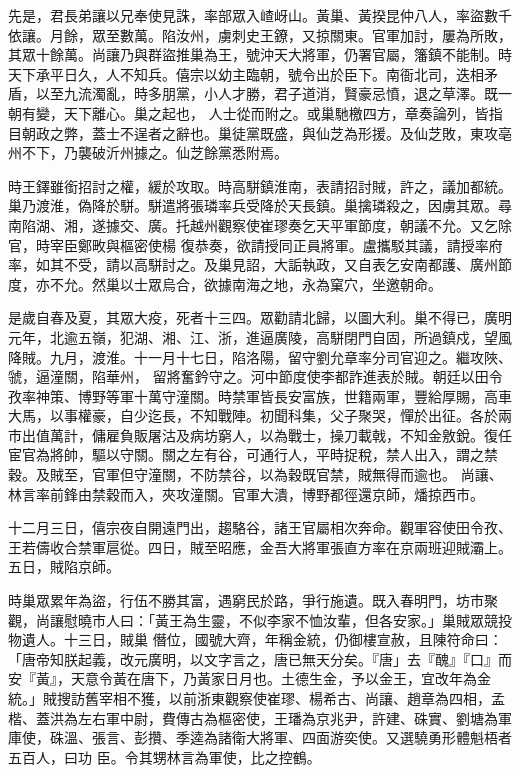 \begin{pinyinscope}
 先是，君長弟讓以兄奉使見誅，率部眾入嵖岈山。黃巢、黃揆昆仲八人，率盜數千依讓。月餘，眾至數萬。陷汝州，虜刺史王鐐，又掠關東。官軍加討，屢為所敗，其眾十餘萬。尚讓乃與群盜推巢為王，號沖天大將軍，仍署官屬，籓鎮不能制。時天下承平日久，人不知兵。僖宗以幼主臨朝，號令出於臣下。南衙北司，迭相矛盾，以至九流濁亂，時多朋黨，小人才勝，君子道消，賢豪忌憤，退之草澤。既一朝有變，天下離心。巢之起也，
 人士從而附之。或巢馳檄四方，章奏論列，皆指目朝政之弊，蓋士不逞者之辭也。巢徒黨既盛，與仙芝為形援。及仙芝敗，東攻亳州不下，乃襲破沂州據之。仙芝餘黨悉附焉。



 時王鐸雖銜招討之權，緩於攻取。時高駢鎮淮南，表請招討賊，許之，議加都統。巢乃渡淮，偽降於駢。駢遣將張璘率兵受降於天長鎮。巢擒璘殺之，因虜其眾。尋南陷湖、湘，遂據交、廣。托越州觀察使崔璆奏乞天平軍節度，朝議不允。又乞除官，時宰臣鄭畋與樞密使楊
 復恭奏，欲請授同正員將軍。盧攜駁其議，請授率府率，如其不受，請以高駢討之。及巢見詔，大詬執政，又自表乞安南都護、廣州節度，亦不允。然巢以士眾烏合，欲據南海之地，永為窠穴，坐邀朝命。



 是歲自春及夏，其眾大疫，死者十三四。眾勸請北歸，以圖大利。巢不得已，廣明元年，北逾五嶺，犯湖、湘、江、浙，進逼廣陵，高駢閉門自固，所過鎮戍，望風降賊。九月，渡淮。十一月十七日，陷洛陽，留守劉允章率分司官迎之。繼攻陜、虢，逼潼關，陷華州，
 留將奮鈐守之。河中節度使李都詐進表於賊。朝廷以田令孜率神策、博野等軍十萬守潼關。時禁軍皆長安富族，世籍兩軍，豐給厚賜，高車大馬，以事權豪，自少迄長，不知戰陣。初聞科集，父子聚哭，憚於出征。各於兩市出值萬計，傭雇負販屠沽及病坊窮人，以為戰士，操刀載戟，不知金敫銳。復任宦官為將帥，驅以守關。關之左有谷，可通行人，平時捉稅，禁人出入，謂之禁穀。及賊至，官軍但守潼關，不防禁谷，以為穀既官禁，賊無得而逾也。
 尚讓、林言率前鋒由禁穀而入，夾攻潼關。官軍大潰，博野都徑還京師，燔掠西市。



 十二月三日，僖宗夜自開遠門出，趨駱谷，諸王官屬相次奔命。觀軍容使田令孜、王若儔收合禁軍扈從。四日，賊至昭應，金吾大將軍張直方率在京兩班迎賊灞上。五日，賊陷京師。



 時巢眾累年為盜，行伍不勝其富，遇窮民於路，爭行施遺。既入春明門，坊市聚觀，尚讓慰曉市人曰：「黃王為生靈，不似李家不恤汝輩，但各安家。」巢賊眾競投物遺人。十三日，賊巢
 僭位，國號大齊，年稱金統，仍御樓宣赦，且陳符命曰：「唐帝知朕起義，改元廣明，以文字言之，唐已無天分矣。『唐」去『醜』『口』而安『黃』，天意令黃在唐下，乃黃家日月也。土德生金，予以金王，宜改年為金統。」賊搜訪舊宰相不獲，以前浙東觀察使崔璆、楊希古、尚讓、趙章為四相，孟楷、蓋洪為左右軍中尉，費傳古為樞密使，王璠為京兆尹，許建、硃實、劉塘為軍庫使，硃溫、張言、彭攢、季逵為諸衛大將軍、四面游奕使。又選驍勇形體魁梧者五百人，曰功
 臣。令其甥林言為軍使，比之控鶴。




\end{pinyinscope}
